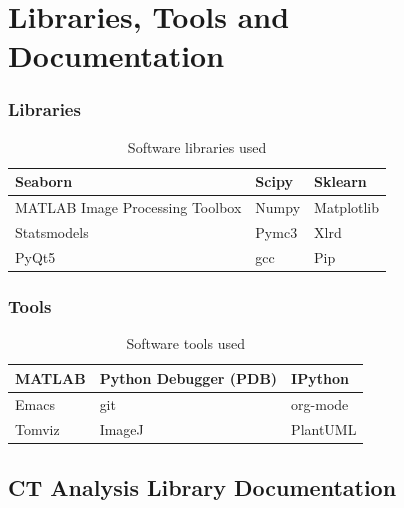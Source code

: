 \documentclass[11pt]{report}
\begin{document}
\clearpage


\chapter{Libraries, Tools and Documentation}
\label{sec:org56a20dd}

\subsection{Libraries}
\label{sec:org39f6f12}
\begin{table}[htbp]
\caption{\label{tab:org4357133}
Software libraries used}
\centering
\begin{tabularx}{\textwidth}{|X|X|X|}
\hline
Seaborn & Scipy & Sklearn\\
\hline
MATLAB Image Processing Toolbox & Numpy & Matplotlib\\
\hline
Statsmodels & Pymc3 & Xlrd\\
\hline
PyQt5 & gcc & Pip\\
\hline
\end{tabularx}
\end{table}

\subsection{Tools}
\label{sec:orga87c466}
\begin{table}[htbp]
\caption{\label{tab:orga7a2b64}
Software tools used}
\centering
\begin{tabularx}{\textwidth}{|X|X|X|}
\hline
MATLAB & Python Debugger (PDB) & IPython\\
\hline
Emacs & git & org-mode\\
\hline
Tomviz & ImageJ & PlantUML\\
\hline
\end{tabularx}
\end{table}

\section{CT Analysis Library Documentation}
\label{sec:org8e1207b}
\clearpage
\end{document}

